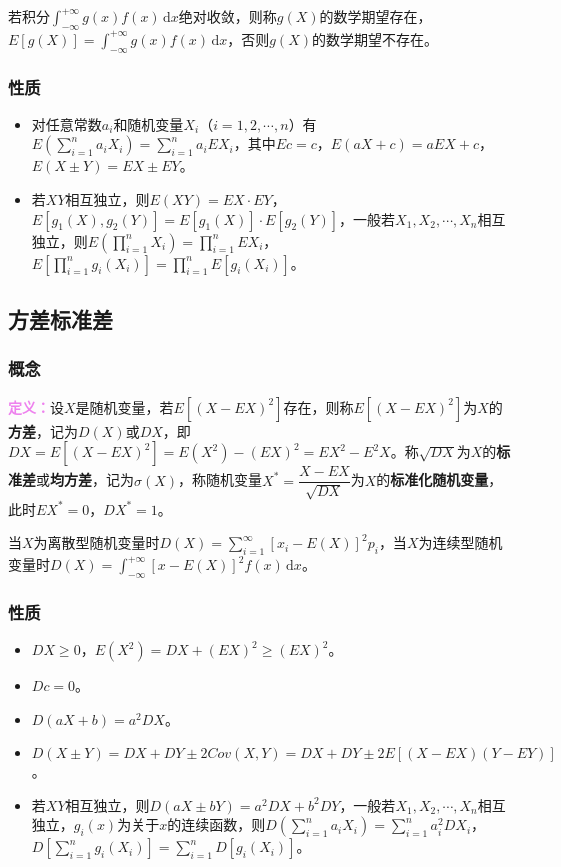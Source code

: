 若积分$\int_{-\infty}^{+\infty}g(x)f(x)\,\textrm{d}x$绝对收敛，则称$g(X)$的数学期望存在，$E[g(X)]=\int_{-\infty}^{+\infty}g(x)f(x)\,\textrm{d}x$，否则$g(X)$的数学期望不存在。

\subsubsection{性质}

\begin{itemize}
    \item 对任意常数$a_i$和随机变量$X_i$（$i=1,2,\cdots,n$）有$E\left(\sum\limits_{i=1}^na_iX_i\right)=\sum\limits_{i=1}^na_iEX_i$，其中$Ec=c$，$E(aX+c)=aEX+c$，$E(X\pm Y)=EX\pm EY$。
    \item 若$XY$相互独立，则$E(XY)=EX\cdot EY$，$E[g_1(X),g_2(Y)]=E[g_1(X)]\cdot E[g_2(Y)]$，一般若$X_1,X_2,\cdots,X_n$相互独立，则$E\left(\prod\limits_{i=1}^nX_i\right)=\prod\limits_{i=1}^nEX_i$，$E\left[\prod\limits_{i=1}^ng_i(X_i)\right]=\prod\limits_{i=1}^nE[g_i(X_i)]$。
\end{itemize}

\subsection{方差标准差}

\subsubsection{概念}

\textcolor{violet}{\textbf{定义：}}设$X$是随机变量，若$E[(X-EX)^2]$存在，则称$E[(X-EX)^2]$为$X$的\textbf{方差}，记为$D(X)$或$DX$，即$DX=E[(X-EX)^2]=E(X^2)-(EX)^2=EX^2-E^2X$。称$\sqrt{DX}$为$X$的\textbf{标准差}或\textbf{均方差}，记为$\sigma(X)$，称随机变量$X^*=\dfrac{X-EX}{\sqrt{DX}}$为$X$的\textbf{标准化随机变量}，此时$EX^*=0$，$DX^*=1$。

当$X$为离散型随机变量时$D(X)=\sum\limits_{i=1}^\infty[x_i-E(X)]^2p_i$，当$X$为连续型随机变量时$D(X)=\int_{-\infty}^{+\infty}[x-E(X)]^2f(x)\,\textrm{d}x$。

\subsubsection{性质}

\begin{itemize}
    \item $DX\geqslant0$，$E(X^2)=DX+(EX)^2\geqslant(EX)^2$。
    \item $Dc=0$。
    \item $D(aX+b)=a^2DX$。
    \item $D(X\pm Y)=DX+DY\pm2Cov(X,Y)=DX+DY\pm2E[(X-EX)(Y-EY)]$。
    \item 若$XY$相互独立，则$D(aX\pm bY)=a^2DX+b^2DY$，一般若$X_1,X_2,\cdots,X_n$相互独立，$g_i(x)$为关于$x$的连续函数，则$D\left(\sum\limits_{i=1}^na_iX_i\right)=\sum\limits_{i=1}^na_i^2DX_i$，$D\left[\sum\limits_{i=1}^ng_i(X_i)\right]=\sum\limits_{i=1}^nD[g_i(X_i)]$。
\end{itemize}

